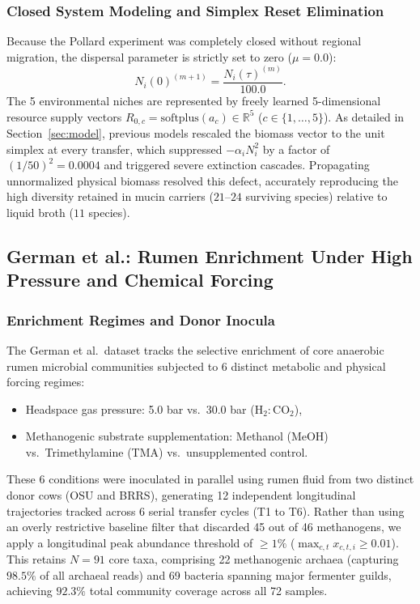 \subsubsection{Closed System Modeling and Simplex Reset Elimination}
Because the Pollard experiment was completely closed without regional migration, the dispersal parameter is strictly set to zero ($\mu = 0.0$):
\begin{equation}
    N_i(0)^{(m+1)} = \frac{N_i(\tau)^{(m)}}{100.0}.
\end{equation}
The 5 environmental niches are represented by freely learned 5-dimensional resource supply vectors $R_{0, c} = \text{softplus}(a_c) \in \mathbb{R}^5$ ($c \in \{1, \dots, 5\}$). As detailed in Section~\ref{sec:model}, previous models rescaled the biomass vector to the unit simplex at every transfer, which suppressed $-\alpha_i N_i^2$ by a factor of $(1/50)^2 = 0.0004$ and triggered severe extinction cascades. Propagating unnormalized physical biomass resolved this defect, accurately reproducing the high diversity retained in mucin carriers ($21\text{--}24$ surviving species) relative to liquid broth ($11$ species).

\subsection{German et al.: Rumen Enrichment Under High Pressure and Chemical Forcing}
\subsubsection{Enrichment Regimes and Donor Inocula}
The German et al.\ dataset tracks the selective enrichment of core anaerobic rumen microbial communities subjected to 6 distinct metabolic and physical forcing regimes:
\begin{itemize}
    \item Headspace gas pressure: 5.0 bar vs.\ 30.0 bar ($\text{H}_2 : \text{CO}_2$),
    \item Methanogenic substrate supplementation: Methanol (MeOH) vs.\ Trimethylamine (TMA) vs.\ unsupplemented control.
\end{itemize}
These 6 conditions were inoculated in parallel using rumen fluid from two distinct donor cows (OSU and BRRS), generating 12 independent longitudinal trajectories tracked across 6 serial transfer cycles (T1 to T6). Rather than using an overly restrictive baseline filter that discarded 45 out of 46 methanogens, we apply a longitudinal peak abundance threshold of $\ge 1\%$ ($\max_{c, t} x_{c, t, i} \ge 0.01$). This retains $N = 91$ core taxa, comprising 22 methanogenic archaea (capturing $98.5\%$ of all archaeal reads) and 69 bacteria spanning major fermenter guilds, achieving $92.3\%$ total community coverage across all 72 samples.

